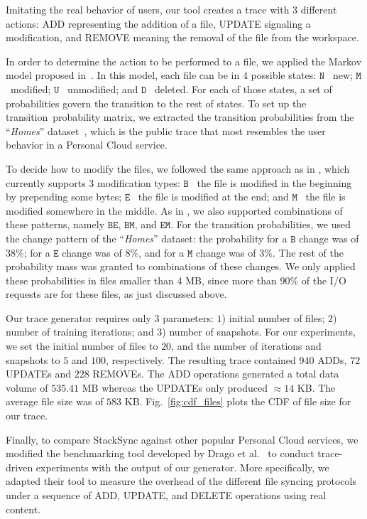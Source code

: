 Imitating the real behavior of users, our tool creates a trace with $3$ different actions: ADD representing the addition
of a file, UPDATE signaling a modification, and REMOVE meaning the removal of the file from the workspace.

In order to determine the action to be performed to a file, we applied the Markov model proposed in~\cite{Tarasov12}. 
In this model, each file can be in $4$ possible states: $\mathtt{N}$ \textemdash~new; $\mathtt{M} $\textemdash~modified; 
$\mathtt{U}$ \textemdash~unmodified; and $\mathtt{D}$ \textemdash~deleted.
For each of those states, a set of probabilities govern the transition to the rest of states.
To set up the transition~probability
matrix, we extracted the transition probabilities from the ``\textit{Homes}'' dataset~\cite{Tarasov12}, 
which is the public trace that most resembles the user behavior in a Personal Cloud service.

To decide how to modify the files, we followed the same approach as in \cite{Tarasov12},
which currently supports $3$ modification types: $\mathtt{B}$ \textemdash~the file is modified in the
beginning by prepending some bytes; $\mathtt{E}$ \textemdash~the file is modified at the end; and $\mathtt{M}$ \textemdash~the
file is modified somewhere in the middle.  As in \cite{Tarasov12}, we also supported
combinations of these patterns, namely $\mathtt{BE}$, $\mathtt{BM}$, and $\mathtt{EM}$. For the transition 
probabilities, we used the change pattern of the ``\textit{Homes}'' dataset: the probability for a $\mathtt{B}$ 
change was of $38\%$; for a $\mathtt{E}$ change was of $8\%$, and for a $\mathtt{M}$ change was of $3\%$. 
The rest of the probability mass was granted to combinations of these changes. We only applied these probabilities
in files smaller than $4$ MB, since more than $90\%$ of the I/O requests are for these files, as just
discussed above.

Our trace generator requires only $3$ parameters: $1$) initial number of files; $2$) number
of training iterations; and $3$) number of snapshots. For our experiments, we set the
initial number of files to $20$, and the number of iterations and snapshots to $5$ and
$100$, respectively. The resulting trace contained $940$ ADDs, $72$ UPDATEs and $228$ REMOVEs.
The ADD operations generated a total data volume of $535.41$ MB whereas the UPDATEs only produced
$\approx 14$ KB. The average file size was of $583$ KB. Fig.~\ref{fig:cdf_files} plots
the CDF of file size for our trace.

Finally, to compare StackSync against other popular Personal Cloud services,
we modified the benchmarking tool developed by Drago et al.~\cite{drago2013benchmarking} to
conduct trace-driven experiments with the output of our generator. More specifically, we adapted
their tool to measure the overhead of the different file syncing protocols under a sequence of
ADD, UPDATE, and DELETE operations using real content.

